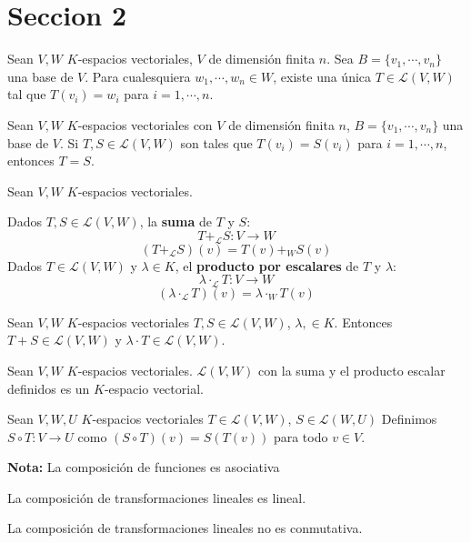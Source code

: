 \section{Seccion 2}
\begin{theorem}{}{}
    Sean $V,W$ $K$-espacios vectoriales, $V$ de dimensión finita $n$. Sea $B = \{v_1, \cdots, v_n\}$ una base de $V$. Para cualesquiera $w_1, \cdots, w_n \in W$, existe una única $T \in \mathcal{L}(V,W)$ tal que $T(v_i) = w_i$ para $i = 1, \cdots, n$.
\end{theorem}
\begin{corollary}{}{}
    Sean $V,W$ $K$-espacios vectoriales con $V$ de dimensión finita $n$, $B = \{v_1, \cdots, v_n\}$ una base de $V$. Si $T, S \in \mathcal{L}(V,W)$ son tales que $T(v_i) = S(v_i)$ para $i = 1, \cdots, n$, entonces $T = S$.
\end{corollary}
\begin{definition}{}{}
    Sean $V,W$ $K$-espacios vectoriales.

    Dados $T, S \in \mathcal{L}(V,W)$, la \textbf{suma} de $T$ y $S$:
    $$T +_\mathcal{L} S: V \rightarrow W$$
    $$(T +_\mathcal{L} S)(v)= T(v) +_W S(v)$$
    Dados $T \in \mathcal{L}(V,W)$ y $\lambda \in K$, el \textbf{producto por escalares} de $T$ y $\lambda$:
    $$\lambda \cdot_\mathcal{L} T: V \rightarrow W$$
    $$(\lambda \cdot_\mathcal{L} T)(v) = \lambda \cdot_W T(v)$$
\end{definition}
\begin{proposition}{}{}
    Sean $V,W$ $K$-espacios vectoriales $T, S \in \mathcal{L}(V,W)$, $\lambda, \in K$. Entonces $T + S \in \mathcal{L}(V,W)$ y $\lambda \cdot T \in \mathcal{L}(V,W)$.
\end{proposition}
\begin{theorem}{}{}
    Sean $V,W$ $K$-espacios vectoriales. $\mathcal{L}(V,W)$ con la suma y el producto escalar definidos es un $K$-espacio vectorial.
\end{theorem}
\begin{definition}{}{}
    Sean $V,W, U$ $K$-espacios vectoriales $T\in \mathcal{L}(V,W)$, $S\in \mathcal{L}(W,U)$ Definimos $S \circ T: V \rightarrow U$ como $(S \circ T)(v) = S(T(v))$ para todo $v \in V$.

    \textbf{Nota:} La composición de funciones es asociativa
\end{definition}
\begin{theorem}{}{}
    La composición de transformaciones lineales es lineal.
\end{theorem}
\begin{obs}{}{}
    La composición de transformaciones lineales no es conmutativa.
\end{obs}
